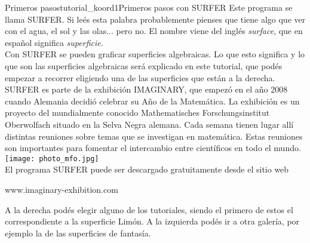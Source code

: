 \begin{surferIntroPage}{Primeros pasos}{tutorial_koord1}{Primeros pasos con SURFER}
Este programa se llama SURFER. Si le\'es esta palabra probablemente pienses que tiene algo que ver con el agua, el sol y las olas... pero no. El nombre viene del ingl\'es {\it surface}, que en espa\~nol significa {\it superficie}.\\
Con SURFER se pueden graficar superficies algebraicas. Lo que esto significa y lo que son las superficies algebraicas ser\'a explicado en este tutorial, que pod\'es empezar a recorrer eligiendo una de las superficies que est\'an a la derecha.\\
SURFER es parte de la exhibici\'on IMAGINARY, que empez\'o en el a\~no 2008 cuando Alemania decidi\'o celebrar su A\~no de la Matem\'atica. La exhibici\'on es un proyecto del mundialmente conocido Mathematisches Forschungsinstitut Oberwolfach situado en la Selva Negra alemana. Cada semana tienen lugar all\'i distintas reuniones sobre temas que se investigan en matem\'atica. Estas reuniones son importantes para fomentar el intercambio entre cient\'ificos en todo el mundo. \\
\vspace{0.2cm} \hspace{3.5cm}\texttt{[image: photo\_mfo.jpg]}\\
El programa SURFER puede ser descargado gratuitamente desde el sitio web \\
\begin{centering}
www.imaginary-exhibition.com\\
\end{centering}
 \vspace{0.2cm}
A la derecha pod\'es elegir alguno de los tutoriales, siendo el primero de estos el correspondiente a la superficie Lim\'on. A la izquierda pod\'es ir a otra galer\'ia, por ejemplo la de las superficies de fantas\'ia.
\end{surferIntroPage}